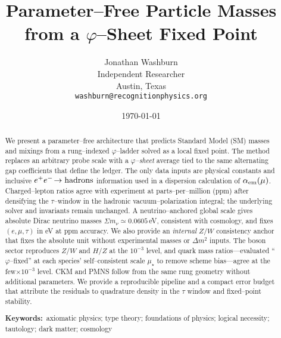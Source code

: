 \documentclass[11pt]{article}
\title{Parameter--Free Particle Masses from a $\varphi$--Sheet Fixed Point}
\author{Jonathan Washburn\\Independent Researcher\\Austin, Texas\\\texttt{washburn@recognitionphysics.org}}
\date{\today}
\newcommand{\keyword}[1]{\textbf{Keywords:}~#1}
\begin{document}
\maketitle

\begin{abstract}
We present a parameter--free architecture that predicts Standard Model (SM) masses and mixings from a rung--indexed $\varphi$--ladder solved as a local fixed point. The method replaces an arbitrary probe scale with a \emph{$\varphi$--sheet} average tied to the same alternating gap coefficients that define the ledger. The only data inputs are physical constants and inclusive $e^+e^-\!\to{\rm hadrons}$ information used in a dispersion calculation of $\alpha_{\rm em}(\mu)$. Charged--lepton ratios agree with experiment at parts--per--million (ppm) after densifying the $\tau$--window in the hadronic vacuum--polarization integral; the underlying solver and invariants remain unchanged. A neutrino--anchored global scale gives absolute Dirac neutrino masses $\Sigma m_\nu\simeq 0.0605$\,eV, consistent with cosmology, and fixes $(e,\mu,\tau)$ in eV at ppm accuracy. We also provide an \emph{internal} $Z/W$ consistency anchor that fixes the absolute unit without experimental masses or $\Delta m^2$ inputs. The boson sector reproduces $Z/W$ and $H/Z$ at the $10^{-3}$ level, and quark mass ratios—evaluated ``$\varphi$--fixed'' at each species' self--consistent scale $\mu_\star$ to remove scheme bias—agree at the few$\times 10^{-3}$ level. CKM and PMNS follow from the same rung geometry without additional parameters. We provide a reproducible pipeline and a compact error budget that attribute the residuals to quadrature density in the $\tau$ window and fixed--point stability.


\keyword{axiomatic physics; type theory; foundations of physics; logical necessity; tautology; dark matter; cosmology} 




\end{abstract}
\end{document}
